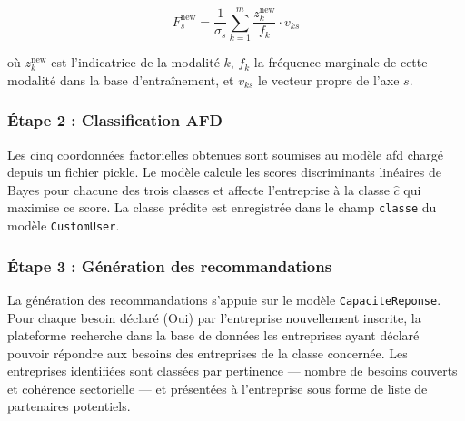 \documentclass[12pt, a4paper, oneside]{report}
\begin{document}
\begin{equation}
  F_s^{\text{new}} = \frac{1}{\sigma_s} \sum_{k=1}^{m} \frac{z_k^{\text{new}}}{f_k} \cdot v_{ks}
  \label{eq:proj_new}
\end{equation}

où $z_k^{\text{new}}$ est l'indicatrice de la modalité $k$, $f_k$ la fréquence marginale de cette modalité dans la base d'entraînement, et $v_{ks}$ le vecteur propre de l'axe $s$.

\subsubsection{Étape 2 : Classification AFD}

Les cinq coordonnées factorielles obtenues sont soumises au modèle \gls{afd} chargé depuis un fichier pickle. Le modèle calcule les scores discriminants linéaires de Bayes pour chacune des trois classes et affecte l'entreprise à la classe $\hat{c}$ qui maximise ce score. La classe prédite est enregistrée dans le champ \texttt{classe} du modèle \texttt{CustomUser}.

\subsubsection{Étape 3 : Génération des recommandations}

La génération des recommandations s'appuie sur le modèle \texttt{CapaciteReponse}. Pour chaque besoin déclaré (Oui) par l'entreprise nouvellement inscrite, la plateforme recherche dans la base de données les entreprises ayant déclaré pouvoir répondre aux besoins des entreprises de la classe concernée. Les entreprises identifiées sont classées par pertinence --- nombre de besoins couverts et cohérence sectorielle --- et présentées à l'entreprise sous forme de liste de partenaires potentiels.
\end{document}
